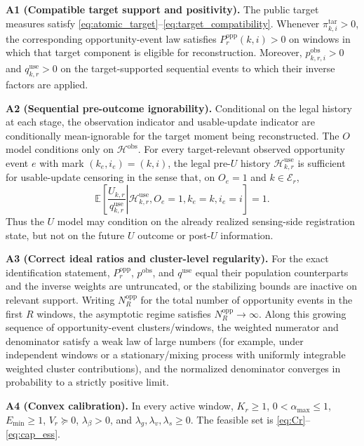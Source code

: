 \documentclass[letterpaper,journal]{IEEEtran}
\begin{document}
\noindent\textbf{A1 (Compatible target support and positivity).}
The public target measures satisfy
\eqref{eq:atomic_target}--\eqref{eq:target_compatibility}.  Whenever
$\pi^{\mathrm{tar}}_{k,i}>0$, the corresponding opportunity-event law satisfies
$P_r^{\mathrm{opp}}(k,i)>0$ on windows in which that target component is
eligible for reconstruction.  Moreover,
$p^{\mathrm{obs}}_{k,r,i}>0$ and $q^{\mathrm{use}}_{k,r}>0$ on the
target-supported sequential events to which their inverse factors are applied.

\noindent\textbf{A2 (Sequential pre-outcome ignorability).}
Conditional on the legal history at each stage, the observation indicator and
usable-update indicator are conditionally mean-ignorable for the target moment
being reconstructed.  The $O$ model conditions only on
$\mathcal{H}^{\mathrm{obs}}$.  For every target-relevant observed opportunity
event $e$ with mark $(k_e,i_e)=(k,i)$, the legal pre-$U$ history
$\mathcal{H}^{\mathrm{use}}_{k,r}$ is sufficient for usable-update censoring in
the sense that, on $O_e=1$ and $k\in\mathcal{E}_r$,
\begin{equation}
 \mathbb{E}\!\left[
 \left.
 \frac{U_{k,r}}{q^{\mathrm{use}}_{k,r}}
 \right|
 \mathcal{H}^{\mathrm{use}}_{k,r},
 O_e=1,k_e=k,i_e=i
 \right]
 =1.
 \label{eq:A2_use_mean_ignorability}
\end{equation}
Thus the $U$ model may condition on the already realized sensing-side
registration state, but not on the future $U$ outcome or post-$U$ information.

\noindent\textbf{A3 (Correct ideal ratios and cluster-level regularity).}
For the exact identification statement,
$P_r^{\mathrm{opp}}$, $p^{\mathrm{obs}}$, and $q^{\mathrm{use}}$ equal their
population counterparts and the inverse weights are untruncated, or the
stabilizing bounds are inactive on relevant support.  Writing
$N_R^{\mathrm{opp}}$ for the total number of opportunity events in the first
$R$ windows, the asymptotic regime satisfies
$N_R^{\mathrm{opp}}\rightarrow\infty$.  Along this growing sequence of
opportunity-event clusters/windows, the weighted numerator and denominator
satisfy a weak law of large numbers (for example, under independent windows or
a stationary/mixing process with uniformly integrable weighted cluster
contributions), and the normalized denominator converges in probability to a
strictly positive limit.

\noindent\textbf{A4 (Convex calibration).}
In every active window, $K_r\ge1$, $0<\alpha_{\max}\le1$, $E_{\min}\ge1$,
$V_r\succeq0$, $\lambda_{\beta}>0$, and
$\lambda_g,\lambda_v,\lambda_s\ge0$.  The feasible set is
\eqref{eq:Cr}--\eqref{eq:cap_ess}.
\end{document}
